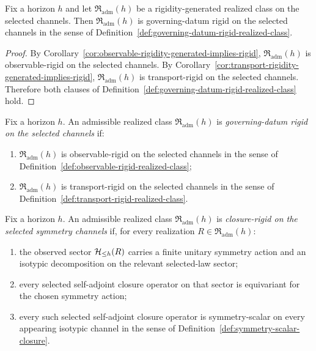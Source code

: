 \begin{corollary}
\label{cor:rigidity-generated-implies-governing-datum-rigid}
Fix a horizon $h$ and let $\mathfrak R_{\mathrm{adm}}(h)$ be a
rigidity-generated realized class on the selected channels. Then
$\mathfrak R_{\mathrm{adm}}(h)$ is governing-datum rigid on the selected
channels in the sense of
Definition~\ref{def:governing-datum-rigid-realized-class}.
\end{corollary}

\begin{proof}
By Corollary~\ref{cor:observable-rigidity-generated-implies-rigid},
$\mathfrak R_{\mathrm{adm}}(h)$ is observable-rigid on the selected channels.
By Corollary~\ref{cor:transport-rigidity-generated-implies-rigid},
$\mathfrak R_{\mathrm{adm}}(h)$ is transport-rigid on the selected channels.
Therefore both clauses of
Definition~\ref{def:governing-datum-rigid-realized-class} hold.
\end{proof}

\begin{definition}
\label{def:governing-datum-rigid-realized-class}
Fix a horizon $h$. An admissible realized class
$\mathfrak R_{\mathrm{adm}}(h)$ is \emph{governing-datum rigid on the selected
channels} if:
\begin{enumerate}[label=(\roman*), leftmargin=2em, itemsep=0.2em]
\item $\mathfrak R_{\mathrm{adm}}(h)$ is observable-rigid on the selected
      channels in the sense of
      Definition~\ref{def:observable-rigid-realized-class};
\item $\mathfrak R_{\mathrm{adm}}(h)$ is transport-rigid on the selected
      channels in the sense of
      Definition~\ref{def:transport-rigid-realized-class}.
\end{enumerate}
\end{definition}

\begin{definition}
\label{def:closure-rigid-realized-class}
Fix a horizon $h$. An admissible realized class
$\mathfrak R_{\mathrm{adm}}(h)$ is \emph{closure-rigid on the selected
symmetry channels} if, for every realization $R\in\mathfrak R_{\mathrm{adm}}(h)$:
\begin{enumerate}[label=(\roman*), leftmargin=2em, itemsep=0.2em]
\item the observed sector $\mathcal{H}_{\le h}(R)$ carries a finite unitary symmetry
      action and an isotypic decomposition on the relevant selected-law sector;
\item every selected self-adjoint closure operator on that sector is
      equivariant for the chosen symmetry action;
\item every such selected self-adjoint closure operator is symmetry-scalar on
      every appearing isotypic channel in the sense of
      Definition~\ref{def:symmetry-scalar-closure}.
\end{enumerate}
\end{definition}

